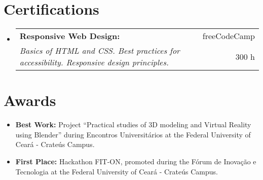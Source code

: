 \documentclass[letterpaper,11pt]{article}
\makeatletter
\newcommand{\resumeItem}[2]{
    \item \small{\textbf{#1}{ #2 \vspace{-2pt}}}
}
\newcommand{\resumeCertifications}[4]{
    \vspace{-1pt}\item
        \begin{tabular*}{0.97\textwidth}{l@{\extracolsep{\fill}}r}
            \textbf{\small#1} & #2 \\
            \textit{\small#3} & \small #4 \\
        \end{tabular*}\vspace{-5pt}
    \vspace{0.1cm}
}
\newcommand{\resumeSubItem}[2]{\resumeItem{#1}{#2}\vspace{-4pt}}
\newcommand{\resumeSubHeadingListStart}{\begin{itemize}[leftmargin=*]}
\newcommand{\resumeSubHeadingListEnd}{\end{itemize}}
\makeatother
\begin{document}
\section{\faCertificate \hspace{0.2cm} \Large Certifications}

    \resumeSubHeadingListStart
        \resumeCertifications
            {Responsive Web Design:}{{\small \faInstitution} \hspace{0.01cm} freeCodeCamp}
            {Basics of HTML and CSS. Best practices for accessibility. Responsive design principles. \href{https://www.freecodecamp.org/certification/danielbrito/responsive-web-design}{\scriptsize \faExternalLink}}{\faClockO \hspace{0.1cm} 300 h}
            
    \resumeSubHeadingListEnd

\section{\faTrophy \hspace{0.2cm} \Large Awards}
    \resumeSubHeadingListStart
        \resumeSubItem{Best Work:}
        {Project ``Practical studies of 3D modeling and Virtual Reality using Blender'' during Encontros Universitários at the Federal University of Ceará - Crateús Campus.}
        
        \resumeSubItem{First Place:}
        {Hackathon FIT-ON, promoted during the Fórum de Inovação e Tecnologia at the Federal University of Ceará - Crateús Campus.}
        
        \vspace{0.2cm}
    \resumeSubHeadingListEnd
\end{document}
